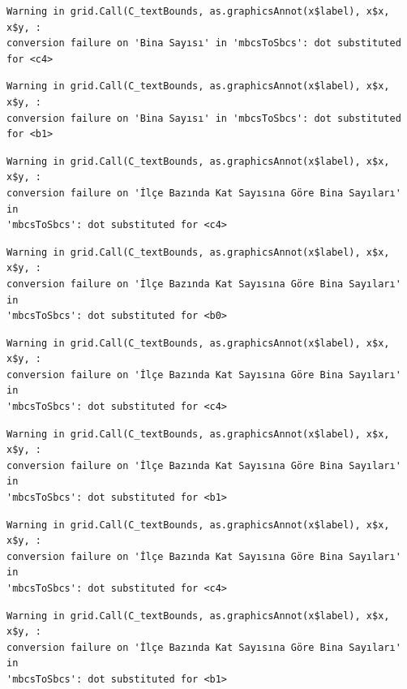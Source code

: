 \documentclass[
  11pt,
  a4paper,
  DIV=11,
  numbers=noendperiod]{scrartcl}
\begin{document}
\begin{verbatim}
Warning in grid.Call(C_textBounds, as.graphicsAnnot(x$label), x$x, x$y, :
conversion failure on 'Bina Sayısı' in 'mbcsToSbcs': dot substituted for <c4>
\end{verbatim}

\begin{verbatim}
Warning in grid.Call(C_textBounds, as.graphicsAnnot(x$label), x$x, x$y, :
conversion failure on 'Bina Sayısı' in 'mbcsToSbcs': dot substituted for <b1>
\end{verbatim}

\begin{verbatim}
Warning in grid.Call(C_textBounds, as.graphicsAnnot(x$label), x$x, x$y, :
conversion failure on 'İlçe Bazında Kat Sayısına Göre Bina Sayıları' in
'mbcsToSbcs': dot substituted for <c4>
\end{verbatim}

\begin{verbatim}
Warning in grid.Call(C_textBounds, as.graphicsAnnot(x$label), x$x, x$y, :
conversion failure on 'İlçe Bazında Kat Sayısına Göre Bina Sayıları' in
'mbcsToSbcs': dot substituted for <b0>
\end{verbatim}

\begin{verbatim}
Warning in grid.Call(C_textBounds, as.graphicsAnnot(x$label), x$x, x$y, :
conversion failure on 'İlçe Bazında Kat Sayısına Göre Bina Sayıları' in
'mbcsToSbcs': dot substituted for <c4>
\end{verbatim}

\begin{verbatim}
Warning in grid.Call(C_textBounds, as.graphicsAnnot(x$label), x$x, x$y, :
conversion failure on 'İlçe Bazında Kat Sayısına Göre Bina Sayıları' in
'mbcsToSbcs': dot substituted for <b1>
\end{verbatim}

\begin{verbatim}
Warning in grid.Call(C_textBounds, as.graphicsAnnot(x$label), x$x, x$y, :
conversion failure on 'İlçe Bazında Kat Sayısına Göre Bina Sayıları' in
'mbcsToSbcs': dot substituted for <c4>
\end{verbatim}

\begin{verbatim}
Warning in grid.Call(C_textBounds, as.graphicsAnnot(x$label), x$x, x$y, :
conversion failure on 'İlçe Bazında Kat Sayısına Göre Bina Sayıları' in
'mbcsToSbcs': dot substituted for <b1>
\end{verbatim}
\end{document}
